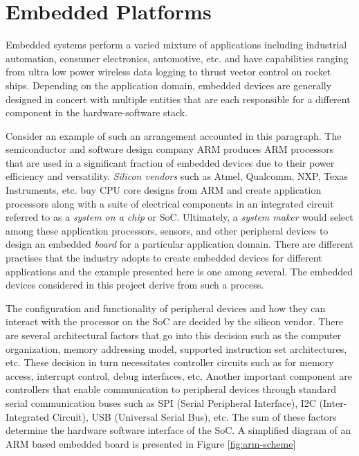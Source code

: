 \section{Embedded Platforms}

Embedded systems perform a varied mixture of applications including industrial automation, consumer electronics, automotive, etc. and have capabilities ranging from ultra low power wireless data logging to thrust vector control on rocket ships. Depending on the application domain, embedded devices are generally designed in concert with multiple entities that are each responsible for a different component in the hardware-software stack.

Consider an example of such an arrangement accounted in this paragraph. The semiconductor and software design company ARM produces ARM processors that are used in a significant fraction of embedded devices due to their power efficiency and versatility. \textit{Silicon vendors} such as Atmel, Qualcomm, NXP, Texas Instruments, etc. buy CPU core designs from ARM and create application processors along with a suite of electrical components in an integrated circuit referred to as a \textit{system on a chip} or SoC. Ultimately, a \textit{system maker} would select among these application processors, sensors, and other peripheral devices to design an embedded \textit{board} for a particular application domain. There are different practises that the industry adopts to create embedded devices for different applications and the example presented here is one among several. The embedded devices considered in this project derive from such a process.

The configuration and functionality of peripheral devices and how they can interact with the processor on the SoC are decided by the silicon vendor. There are several architectural factors that go into this decision such as the computer organization, memory addressing model, supported instruction set architectures, etc. These decision in turn necessitates controller circuits such as for memory access, interrupt control, debug interfaces, etc. Another important component are controllers that enable communication to peripheral devices through standard serial communication buses such as SPI (Serial Peripheral Interface), I2C (Inter-Integrated Circuit), USB (Universal Serial Bus), etc. The sum of these factors determine the hardware software interface of the SoC. A simplified diagram of an ARM based embedded board is presented in Figure \ref{fig:arm-scheme}


